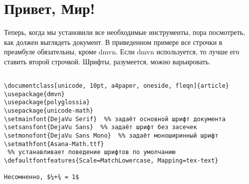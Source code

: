 \section{Привет, Мир!}

Теперь, когда мы установили все необходимые инструменты, пора посмотреть,
как должен выглядеть документ. В приведенном примере все строчки в преамбуле обязательны, 
кроме {\ttfamily dmvn}. Если dmvn используется, то лучше его ставить второй строчкой. 
Шрифты, разумеется, можно варьировать.

\begin{verbatim}

\documentclass[unicode, 10pt, a4paper, oneside, fleqn]{article}
\usepackage{dmvn}
\usepackage{polyglossia}
\usepackage{unicode-math} 
\setmainfont{DejaVu Serif}  %% задаёт основной шрифт документа
\setsansfont{DejaVu Sans}  %% задаёт шрифт без засечек
\setmonofont{DejaVu Sans Mono}  %% задаёт моноширинный шрифт
\setmathfont{Asana-Math.ttf}
 %% устанавливает поведение шрифтов по умолчанию
\defaultfontfeatures{Scale=MatchLowercase, Mapping=tex-text} 

Несомненно, $¼+¾ = 1$

\end{verbatim}
